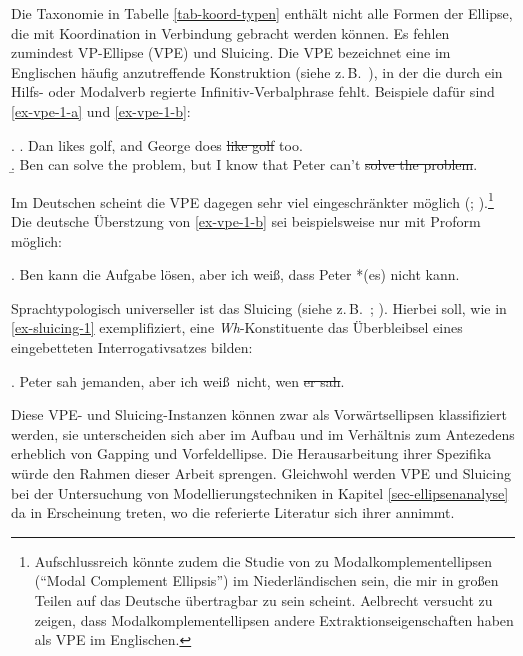 Die Taxonomie in Tabelle \ref{tab-koord-typen} enthält nicht alle Formen der Ellipse, die mit Koordination in Verbindung gebracht werden können. Es fehlen zumindest VP-Ellipse (VPE) und Sluicing. Die VPE bezeichnet eine im Englischen häufig anzutreffende Konstruktion (siehe z.\,B.\  \citealt{Hardt:93,Johnson:01}), in der die durch ein Hilfs- oder Modalverb regierte Infinitiv-Verbalphrase fehlt. Beispiele dafür sind \ref{ex-vpe-1-a} und \ref{ex-vpe-1-b}:

\ex. \label{ex-vpe-1}
\a. Dan likes golf, and George does \sout{like golf} too. \\ \citep[(1)]{Dalrymple:etal:91}\label{ex-vpe-1-a}
\b. Ben can solve the problem, but I know that Peter can't \sout{solve the problem}. \hfill \citep[(32a), 134]{Winkler:05}\label{ex-vpe-1-b}

Im Deutschen scheint die VPE dagegen sehr viel eingeschränkter möglich (\citealt[158ff]{Lobeck:95}; \citealt[Kapitel~3]{Winkler:05}).\footnote{Aufschlussreich könnte zudem die Studie von \citet[Kapitel~2]{Aelbrecht:10} zu Modalkomplementellipsen ("`Modal Complement Ellipsis"') im Niederländischen sein, die mir in gro\ss en Teilen auf das Deutsche übertragbar zu sein scheint. Aelbrecht versucht zu zeigen, dass Modalkomplementellipsen andere Extraktionseigenschaften haben als VPE im Englischen.} Die deutsche Überstzung von \ref{ex-vpe-1-b} sei beispielsweise nur mit Proform möglich: 

\ex. Ben kann die Aufgabe lösen, aber ich weiß, dass Peter *(es) nicht kann. \hfill \citep[(33a), 134]{Winkler:05}\label{ex-vpe-2}

Sprachtypologisch universeller ist das Sluicing (siehe z.\,B.\  \citealt{Ross:69}; \citealt{Merchant:01}). Hierbei soll, wie in \ref{ex-sluicing-1} exemplifiziert, eine \textit{Wh}-Konstituente das Überbleibsel eines eingebetteten Interrogativsatzes bilden: 
 
\ex. \label{ex-sluicing-1}Peter sah jemanden, aber ich wei\ss\ nicht, wen \sout{er sah}.

Diese VPE- und Sluicing-Instanzen können zwar als Vorwärtsellipsen klassifiziert werden, sie unterscheiden sich aber im Aufbau und im Verhältnis zum Antezedens erheblich von Gapping und Vorfeldellipse. Die Herausarbeitung ihrer Spezifika würde den Rahmen dieser Arbeit sprengen. Gleichwohl werden VPE und Sluicing bei der Untersuchung von Modellierungstechniken in Kapitel \ref{sec-ellipsenanalyse} da in Erscheinung treten, wo die referierte Literatur sich ihrer annimmt.

